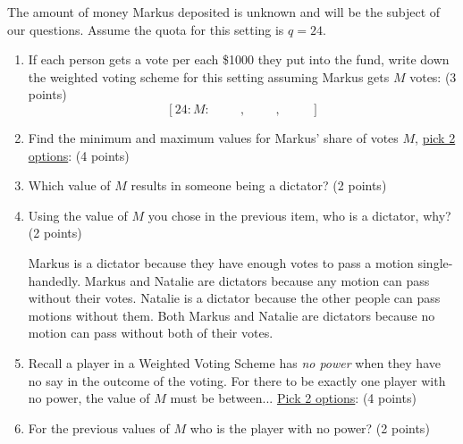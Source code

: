 \documentclass[12pt]{exam}
\begin{document}
\begin{enumerate}
The amount of money Markus deposited is unknown and will be the subject of our questions. Assume the quota for this setting is $q=24$.
\begin{enumerate}
\item \label{firstQnSec2} If each person gets a vote per each \$1000 they put into the fund, write down the weighted voting scheme for this setting assuming Markus gets $M$ votes: (3 points)\vspace{1em}
$$[24:M:\hspace{1cm},\hspace{1cm},\hspace{1cm}]$$
\vfill
\newpage
\item Find the minimum and maximum values for Markus' share of votes $M$, \underline{pick 2 options}: (4 points)
\begin{checkboxes}
\end{checkboxes}
\vfill
\item Which value of $M$ results in someone being a dictator? (2 points)
\begin{checkboxes}
\end{checkboxes}
\vfill
\item Using the value of $M$ you chose in the previous item, who is a dictator, why? (2 points)
\begin{checkboxes}
    \choice Markus is a dictator because they have enough votes to pass a motion single-handedly.
    \choice Markus and Natalie are dictators because any motion can pass without their votes.
    \choice Natalie is a dictator because the other people can pass motions without them.
    \choice Both Markus and Natalie are dictators because no motion can pass without both of their votes.
\end{checkboxes}
\vfill
\item Recall a player in a Weighted Voting Scheme has \emph{no power} when they have no say in the outcome of the voting. For there to be exactly one player with no power, the value of $M$ must be between... \underline{Pick 2 options}: (4 points)
\begin{checkboxes}
\end{checkboxes}
\vfill
\newpage
\item For the previous values of $M$ who is the player with no power? (2 points)

\end{enumerate}
\end{enumerate}
\end{document}
